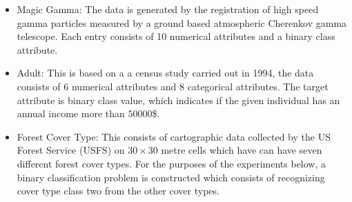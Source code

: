 \begin{itemize}
\item Magic Gamma: The data is generated by the registration of high speed gamma particles measured by a ground based atmospheric Cherenkov gamma telescope. Each entry consists of 10 numerical attributes and a binary class attribute. 

\begin{table*}[!htbp]
\caption{Magic Gamma Metadata}
\label{table:magicgamma}
\centering
{}
\end{table*}


\item Adult: This is based on a a census study carried out in 1994, the data consists of 6 numerical attributes and 8 categorical attributes. The target attribute is binary class value, which indicates if the given individual has an annual income more than $50 000$\$.

\begin{table*}[!htbp]
\caption{Adult Metadata}
\label{table:adult}
\centering
{}
\end{table*}


\item Forest Cover Type: This consists of cartographic data collected by the US Forest Service (USFS) on $30 \times 30$ metre cells which have can have seven different forest cover types. For the purposes of the experiments below, a binary classification problem is constructed which consists of recognizing cover type class two from the other cover types. 

\begin{table*}[!htbp]
\caption{Cover Type Metadata}
\label{table:forestcover}
\centering
{}
\end{table*}

\end{itemize}

